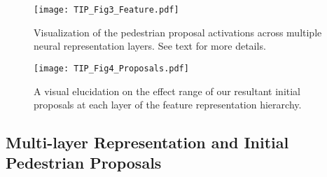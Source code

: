 \documentclass[10pt,journal,compsoc,twoside]{IEEEtran}
\begin{document}
\begin{figure}[!t]
\centering
\texttt{[image: TIP\_Fig3\_Feature.pdf]}
\caption{Visualization of the pedestrian proposal activations across multiple neural representation layers. See text for more details.}
\label{fig_3}
\end{figure}



\begin{figure}[!t]
\centering
\texttt{[image: TIP\_Fig4\_Proposals.pdf]}
\caption{A visual elucidation on the effect range of our resultant initial proposals at each layer of the feature representation hierarchy.}
\label{fig_4}
\end{figure}


\subsection{Multi-layer Representation and Initial Pedestrian Proposals}
\label{sec:section 3}
\end{document}
